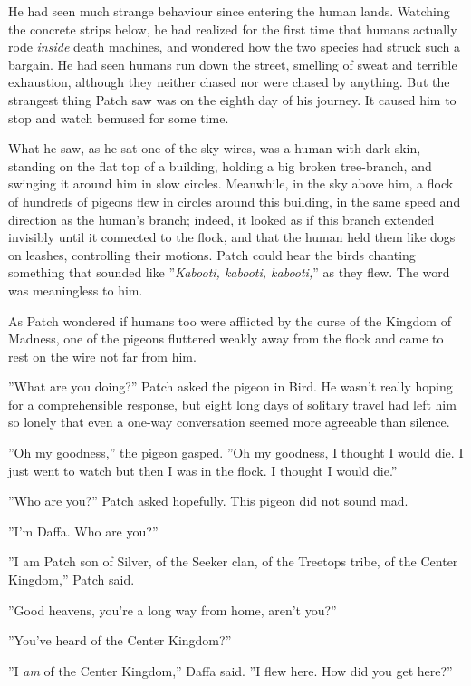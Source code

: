 \documentclass[12pt]{book}
\begin{document}
He had seen much strange behaviour since entering the human lands. Watching the concrete strips below, he had realized for the first time that humans actually rode {\it inside} death machines, and wondered how the two species had struck such a bargain. He had seen humans run down the street, smelling of sweat and terrible exhaustion, although they neither chased nor were chased by anything. But the strangest thing Patch saw was on the eighth day of his journey. It caused him to stop and watch bemused for some time.

What he saw, as he sat one of the sky-wires, was a human with dark skin, standing on the flat top of a building, holding a big broken tree-branch, and swinging it around him in slow circles. Meanwhile, in the sky above him, a flock of hundreds of pigeons flew in circles around this building, in the same speed and direction as the human's branch; indeed, it looked as if this branch extended invisibly until it connected to the flock, and that the human held them like dogs on leashes, controlling their motions. Patch could hear the birds chanting something that sounded like ''{\it Kabooti, kabooti, kabooti,}'' as they flew. The word was meaningless to him.

As Patch wondered if humans too were afflicted by the curse of the Kingdom of Madness, one of the pigeons fluttered weakly away from the flock and came to rest on the wire not far from him.

''What are you doing?'' Patch asked the pigeon in Bird. He wasn't really hoping for a comprehensible response, but eight long days of solitary travel had left him so lonely that even a one-way conversation seemed more agreeable than silence.

''Oh my goodness,'' the pigeon gasped. ''Oh my goodness, I thought I would die. I just went to watch but then I was in the flock. I thought I would die.''

''Who are you?'' Patch asked hopefully. This pigeon did not sound mad.

''I'm Daffa. Who are you?''

''I am Patch son of Silver, of the Seeker clan, of the Treetops tribe, of the Center Kingdom,'' Patch said.

''Good heavens, you're a long way from home, aren't you?''

''You've heard of the Center Kingdom?''

''I {\it am} of the Center Kingdom,'' Daffa said. ''I flew here. How did you get here?''
\end{document}
